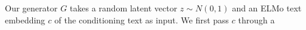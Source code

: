 Our generator $G$ takes a random latent vector $z \sim N(0, 1)$ and an ELMo text embedding $c$ of the conditioning text as input. We first pass $c$ through a  